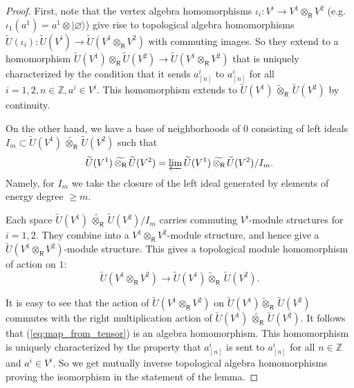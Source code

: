 \documentclass{amsart}
\theoremstyle{definition}
\newcommand{\Ring}{\mathsf{R}}
\newcommand{\Z}{\mathbb{Z}}
\numberwithin{equation}{section}
\begin{document}
\begin{proof}
First, note that the vertex algebra homomorphisms $\iota_i:V^i\rightarrow V^1\otimes_{\Ring}V^2$ (e.g. $\iota_1(a^1)=a^1\otimes |\varnothing\rangle$) give rise to topological algebra homomorphisms $\tilde{U}(\iota_i): \tilde{U}(V^i)\rightarrow \tilde{U}(V^1\otimes_\Ring V^2)$ with commuting images. So they extend to a homomorphism $\tilde{U}(V^1)\otimes_\Ring \tilde{U}(V^2)\rightarrow \tilde{U}(V^1\otimes_\Ring V^2)$ that is uniquely characterized by the condition that it sends $a^i_{[n]}$ to $a^i_{[n]}$ for all $i=1,2, n\in \Z, a^i\in V^i$. This homomorphism extends to  $\widetilde{U}(V^1)\, \widetilde{\otimes}_{\Ring} \,\widetilde{U}(V^2)$ by continuity. 

On the other hand, we have a base of neighborhoods of $0$ consisting of left ideals $I_m\subset \widetilde{U}(V^1)\, \widetilde{\otimes_{\Ring}} \,\widetilde{U}(V^2)$ such that 
$$\widetilde{U}(V^1)\, \widetilde{\otimes_{\Ring}} \,\widetilde{U}(V^2)=\varprojlim \widetilde{U}(V^1)\, \widetilde{\otimes_{\Ring}} \,\widetilde{U}(V^2)/I_m.$$
Namely, for $I_m$ we take the closure of the left ideal generated by elements of energy degree $\geqslant m$.

Each space $\widetilde{U}(V^1)\, \widetilde{\otimes_{\Ring}} \,\widetilde{U}(V^2)/I_m$ carries commuting $V^i$-module structures for $i=1,2$. They combine into a $V^1\otimes_\Ring V^2$-module structure, and hence give a $\widetilde{U}(V^1\otimes_\Ring V^2)$-module structure. This gives a topological module  homomorphism of action on $1$:
\begin{equation}\label{eq:map_from_tensor}
\widetilde{U}(V^1\otimes_\Ring V^2)\rightarrow 
\widetilde{U}(V^1) \widetilde{\otimes}_{\Ring} \,\widetilde{U}(V^2).
\end{equation}

It is easy to see that the action of $\tilde{U}(V^1\otimes_\Ring V^2)$ on  $\widetilde{U}(V^1)\widetilde{\otimes}_{\Ring} \,\widetilde{U}(V^2)$ commutes with the right multiplication action of $\widetilde{U}(V^1)\, \widetilde{\otimes_{\Ring}} \,\widetilde{U}(V^2)$. It follows that (\ref{eq:map_from_tensor}) is an algebra homomorphism. 
This homomorphism is uniquely characterized by the property that $a^i_{[n]}$ is sent to $a^i_{[n]}$ for all $n\in \Z$ and $a^i\in V^i$. So we get mutually inverse topological algebra homomorphisms proving the isomorphism in the statement of the lemma. 
\end{proof}
\end{document}

